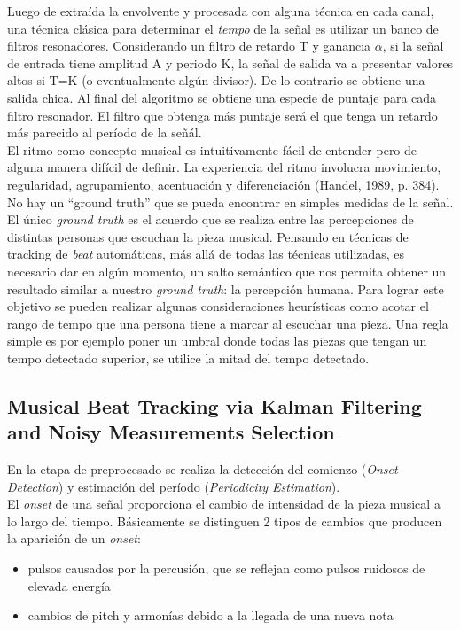 \documentclass[12pt,a4paper,titlepage]{report}
\begin{document}
Luego de extraída la envolvente y procesada con alguna técnica en cada canal, una técnica clásica para determinar el \emph{tempo} de la señal es utilizar un banco de filtros resonadores.
Considerando un filtro de retardo T y ganancia $\alpha$, si la señal de entrada tiene amplitud A y periodo K, la señal de salida va a presentar valores altos si T=K (o eventualmente algún divisor). De lo contrario se obtiene una salida chica. Al final del algoritmo se obtiene una especie de puntaje para cada filtro resonador. El filtro que obtenga más puntaje será el que tenga un retardo más parecido al período de la señál.\\

El ritmo como concepto musical es intuitivamente fácil de entender pero de alguna manera difícil de definir. La experiencia del ritmo involucra movimiento, regularidad, agrupamiento, acentuación y diferenciación (Handel, 1989, p. 384). No hay un ``ground truth'' que se pueda encontrar en simples medidas de la señal. El único \emph{ground truth} es el acuerdo que se realiza entre las percepciones de distintas personas que escuchan la pieza musical. Pensando en técnicas de tracking de \emph{beat} automáticas, más allá de todas las técnicas utilizadas, es necesario dar en algún momento, un salto semántico que nos permita obtener un resultado similar a nuestro \emph{ground truth}: la percepción humana. Para lograr este objetivo se pueden realizar algunas consideraciones heurísticas como acotar el rango de tempo que una persona tiene a marcar al escuchar una pieza. Una regla simple es por ejemplo poner un umbral donde todas las piezas que tengan un tempo detectado superior, se utilice la mitad del tempo detectado.

\subsection*{Musical Beat Tracking via Kalman Filtering and Noisy Measurements Selection}

En la etapa de preprocesado se realiza la detección del comienzo (\emph{Onset Detection}) y estimación del período (\emph{Periodicity Estimation}).\\

El \emph{onset} de una señal proporciona el cambio de intensidad de la pieza musical a lo largo del tiempo. Básicamente se distinguen 2 tipos de cambios que producen la aparición de un \emph{onset}:
\begin{itemize}
	\item pulsos causados por la percusión, que se reflejan como pulsos ruidosos de elevada energía
	\item cambios de pitch y armonías debido a la llegada de una nueva nota
\end{itemize}
\end{document}
